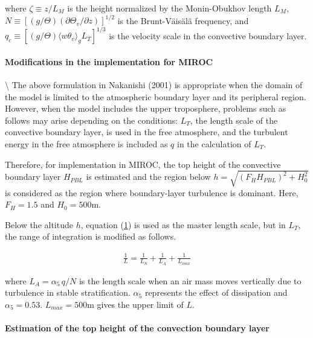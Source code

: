 where \(\zeta\equiv z/L_M\) is the height normalized by the
Monin-Obukhov length \(L_M\),
\(N\equiv\left[(g/\Theta)(\partial\Theta_v/\partial z)\right]^{1/2}\) is
the Brunt-Väisälä frequency, and
\(q_c\equiv [(g/\Theta)\langle w\theta_v \rangle_gL_T]^{1/3}\) is the
velocity scale in the convective boundary layer.

\hypertarget{modifications-in-the-implementation-for-miroc}{%
\paragraph{Modifications in the implementation for
MIROC}\label{modifications-in-the-implementation-for-miroc}}

\textbackslash{} The above formulation in Nakanishi (2001) is
appropriate when the domain of the model is limited to the atmospheric
boundary layer and its peripheral region. However, when the model
includes the upper troposphere, problems such as follows may arise
depending on the conditions: \(L_T\), the length scale of the convective
boundary layer, is used in the free atmosphere, and the turbulent energy
in the free atmosphere is included as \(q\) in the calculation of
\(L_T\).

Therefore, for implementation in MIROC, the top height of the convective
boundary layer \(H_{PBL}\) is estimated and the region below
\(h=\sqrt{(F_H H_{PBL})^2+H_0^2}\) is considered as the region where
boundary-layer turbulence is dominant. Here, \(F_H=1.5\) and
\(H_0=500\)m.

Below the altitude \(h\), equation (\href{p-dif.1}{1}) is used as the
master length scale, but in \(L_T\), the range of integration is
modified as follows.

\begin{eqnarray}\frac{1}{L}=\frac{1}{L_S}+\frac{1}{L_A}+\frac{1}{L_{max}}\end{eqnarray}

where \(L_A=\alpha_5\,q/N\) is the length scale when an air mass moves
vertically due to turbulence in stable stratification. \(\alpha_5\)
represents the effect of dissipation and \(\alpha_5=0.53\).
\(L_{max}=500\)m gives the upper limit of \(L\).

\hypertarget{estimation-of-the-top-height-of-the-convection-boundary-layer}{%
\paragraph{Estimation of the top height of the convection boundary
layer}\label{estimation-of-the-top-height-of-the-convection-boundary-layer}}

